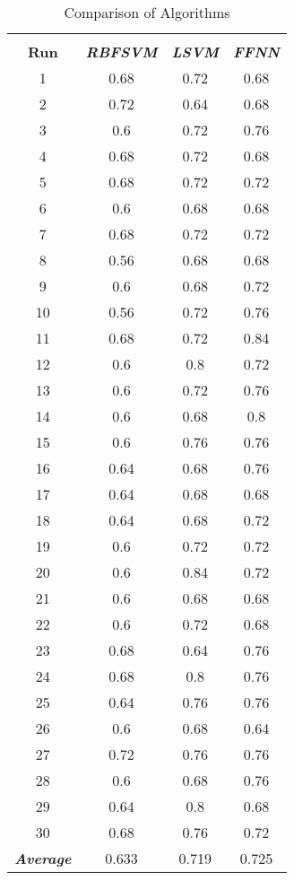 \documentclass[conference]{IEEEtran}
\begin{document}
\begin{table}[ht]
\caption{Comparison of Algorithms}
\def\arraystretch{1.1}
\begin{center}
\begin{tabular}{|c|c|c|c|}
\hline
\textbf{}&\textbf{}&\textbf{}&\textbf{} \\
\textbf{Run} & \textbf{\textit{RBFSVM}} & \textbf{\textit{LSVM}} & \textbf{\textit{FFNN}} \\
\hline
1 & 0.68 & 0.72 & 0.68 \\
2 & 0.72 & 0.64 & 0.68 \\
3 & 0.6 & 0.72 & 0.76 \\
4 & 0.68 & 0.72 & 0.68 \\
5 & 0.68 & 0.72 & 0.72 \\
6 & 0.6 & 0.68 & 0.68 \\
7 & 0.68 & 0.72 & 0.72 \\
8 & 0.56 & 0.68 & 0.68 \\
9 & 0.6 & 0.68 & 0.72 \\
10 & 0.56 & 0.72 & 0.76 \\
11 & 0.68 & 0.72 & 0.84 \\
12 & 0.6 & 0.8 & 0.72 \\
13 & 0.6 & 0.72 & 0.76 \\
14 & 0.6 & 0.68 & 0.8 \\
15 & 0.6 & 0.76 & 0.76 \\
16 & 0.64 & 0.68 & 0.76 \\
17 & 0.64 & 0.68 & 0.68 \\
18 & 0.64 & 0.68 & 0.72 \\
19 & 0.6 & 0.72 & 0.72 \\
20 & 0.6 & 0.84 & 0.72 \\
21 & 0.6 & 0.68 & 0.68 \\
22 & 0.6 & 0.72 & 0.68 \\
23 & 0.68 & 0.64 & 0.76 \\
24 & 0.68 & 0.8 & 0.76 \\
25 & 0.64 & 0.76 & 0.76 \\
26 & 0.6 & 0.68 & 0.64 \\
27 & 0.72 & 0.76 & 0.76 \\
28 & 0.6 & 0.68 & 0.76 \\
29 & 0.64 & 0.8 & 0.68 \\
30 & 0.68 & 0.76 & 0.72  \\
\hline
\textbf{\textit{Average}} & 0.633 & 0.719 & 0.725 \\
\hline
\end{tabular}
\label{table_comparison_results}
\end{center}
\end{table}
\end{document}

